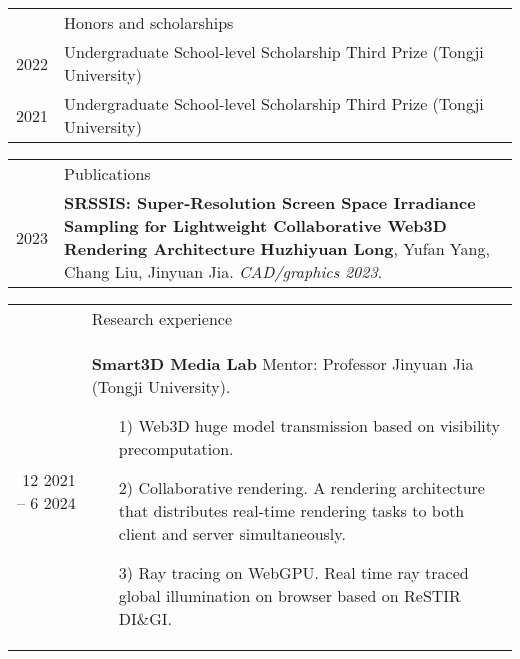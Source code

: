\documentclass[letterpaper, 11pt]{article}
\newcommand{\headingfont}{\Large\color{OliveGreen}}
\newenvironment{SectionTable}[1]{
	\renewcommand*{\arraystretch}{1.7}
	\setlength{\tabcolsep}{10pt}
	\begin{longtable}{Rp{5.2in}} & #1 \\}
{\end{longtable}\vspace{-.3cm}}
\newenvironment{SectionTableSingleSpace}[1]{
	\renewcommand*{\arraystretch}{1.2}
	\setlength{\tabcolsep}{10pt}
	\begin{longtable}{Rp{5.2in}} & #1 \\[0.6em]}
{\end{longtable}\vspace{-.3cm}}
\begin{document}

\begin{SectionTableSingleSpace}{\headingfont Honors and scholarships}


    2022 &
    Undergraduate School-level Scholarship Third Prize (Tongji University) \\

    2021 &
    Undergraduate School-level Scholarship Third Prize (Tongji University)
\end{SectionTableSingleSpace}


\begin{SectionTable}{\headingfont Publications}
    2023 &
    \textbf{SRSSIS: Super-Resolution Screen Space Irradiance Sampling for Lightweight Collaborative Web3D Rendering Architecture} \newline
    \textbf{Huzhiyuan Long}, Yufan Yang, Chang Liu, Jinyuan Jia. \newline
    \textit{CAD/graphics 2023}. \\


\end{SectionTable}


\begin{SectionTable}{\headingfont Research experience}
    12 2021 -- 6 2024 &
    \textbf{Smart3D Media Lab} \newline
    Mentor: Professor Jinyuan Jia (Tongji University). \newline
    \begin{itemize}
        \item [1)]
              Web3D huge model transmission based on visibility precomputation.
        \item [2)]
              Collaborative rendering. A rendering architecture that distributes real-time rendering tasks to both client and server simultaneously.
        \item [3)]
              Ray tracing on WebGPU. Real time ray traced global illumination on browser based on ReSTIR DI\&GI.
    \end{itemize} \\

\end{SectionTable}
\end{document}
